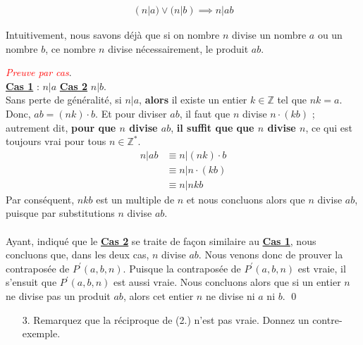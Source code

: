 \documentclass[16pt]{report}
\begin{document}
\begin{multicols*}{2}
\begin{Preuve*}{}{}
        \begin{align}
                (n|a) \lor (n|b) \implies n|ab                    
        \end{align}

        \begin{note}{}{}
            Intuitivement, nous savons déjà que si on nombre $n$ divise un nombre
            $a$ ou un nombre $b$, ce nombre $n$ divise nécessairement, le produit $ab$.
        \end{note}

        \textit{\textcolor{red}{Preuve par cas}}. \vspace{1em} \\
        \underline{\textbf{Cas 1}} : $n|a$ \underline{\textbf{Cas 2}} $n|b$. \\ 
        Sans perte de généralité, si $n|a$, \textbf{alors} il existe un entier $k \in \mathbb{Z}$ tel que 
        $nk = a$. Donc, $ab = (nk) \cdot b$. Et pour diviser $ab$, 
        il faut que $n$ divise $n \cdot (kb)$ ;  autrement dit, \textbf{pour que $n$ divise $ab$}, 
        \textbf{il suffit que que $n$ divise $n$}, ce qui est toujours vrai pour tous $n \in \mathbb{Z^*}$. 
        \begin{align*}
            n|ab &\equiv n|(nk) \cdot b \\
                 &\equiv n|n \cdot (kb) \\ 
                 &\equiv n|nkb
        \end{align*}
        Par conséquent, $nkb$ est un multiple de $n$ et nous concluons alors que $n$ divise $ab$, puisque 
        par substitutions $n$ divise $ab$.
        
        \paragraph{}
        Ayant, indiqué que le \underline{\textbf{Cas 2}} se traite de façon similaire au \underline{\textbf{Cas 1}},
        nous concluons que, dans les deux cas, $n$ divise $ab$. Nous venons donc de prouver la contraposée 
        de $P^{\prime}(a,b,n)$. Puisque la contraposée de $P^{\prime}(a,b,n)$ est vraie, il s'ensuit que 
        $P^{\prime}(a,b,n)$ est aussi vraie. Nous concluons alors que si un entier $n$ ne divise pas un produit 
        $ab$, alors cet entier $n$ ne divise ni $a$ ni $b$. \qed 
    \end{Preuve*}

    \begin{enumerate}
        \item[3.] Remarquez que la réciproque de (2.) n’est pas vraie. Donnez un contre-exemple. 
    \end{enumerate}


\end{multicols*}
\end{document}

